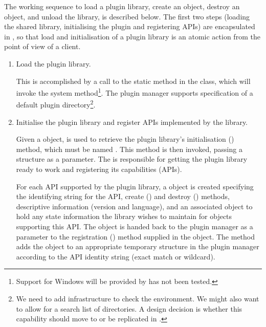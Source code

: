 \documentclass{article}
\newcommand{\OsiTwoControl}{\pgmid{Osi2::ControlAPI}\xspace}
\begin{document}
The working sequence to load a plugin library, create an object, destroy an
object, and unload the library, is described below.
The first two steps (loading the shared library, initialising the plugin and
registering APIs) are encapsulated in , so
that load and initialisation of a plugin library is an atomic action from the
point of view of a client.
\begin{enumerate}
  \item
  Load the plugin library.

  This is accomplished by a call to the static 
  method in the  class, which will invoke the system
   method\footnote{%
      Support for Windows will be provided by has not been tested.}.
  The plugin manager supports specification of a default plugin
  directory\footnote{%
    We need to add infrastructure to check the environment. We might also
    want to allow for a search list of directories.
    A design decision is whether this capability should move to
    \OsiTwoControl or be replicated in \OsiTwoControl.}.

  \item
  Initialise the plugin library and register APIs implemented by the library.

  Given a  object,  is used to
  retrieve the plugin library's initialisation () method,
  which must be named .
  This method is then invoked,
  passing a  structure as a parameter.
  The  is responsible
  for getting the plugin library ready to work and registering
  its capabilities (APIs).

  For each API supported by the plugin library, a  object
  is created specifying the identifying string for the API, create
  () and destroy () methods,
  descriptive information (version and language), and an associated
  object to hold any state information the library wishes to maintain for
  objects supporting this API.
  The  object is handed back to the plugin manager
  as a parameter to the registration () method
  supplied in the  object.
  The  method adds the  object to
  an appropriate temporary structure in the plugin manager
  according to the API identity string (exact match or wildcard).


\end{enumerate}
\end{document}
